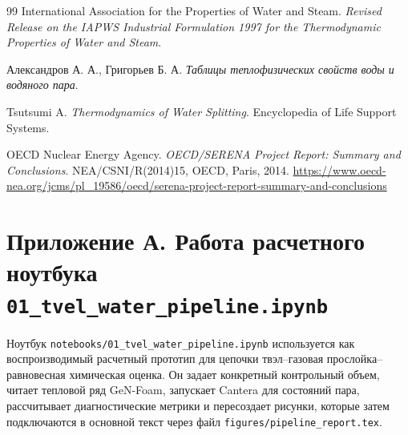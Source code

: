 \documentclass[12pt]{article}
\begin{document}
\begin{thebibliography}{99}
International Association for the Properties of Water and Steam.
\textit{Revised Release on the IAPWS Industrial Formulation 1997 for the Thermodynamic Properties of Water and Steam}.

Александров А. А., Григорьев Б. А.
\textit{Таблицы теплофизических свойств воды и водяного пара}.

Tsutsumi A.
\textit{Thermodynamics of Water Splitting}.
Encyclopedia of Life Support Systems.

OECD Nuclear Energy Agency.
\textit{OECD/SERENA Project Report: Summary and Conclusions}.
NEA/CSNI/R(2014)15, OECD, Paris, 2014.
\url{https://www.oecd-nea.org/jcms/pl_19586/oecd/serena-project-report-summary-and-conclusions}

\end{thebibliography}

\newpage
\section*{Приложение А. Работа расчетного ноутбука \texttt{01\_tvel\_water\_pipeline.ipynb}}

Ноутбук \texttt{notebooks/01\_tvel\_water\_pipeline.ipynb} используется как воспроизводимый расчетный прототип для цепочки твэл--газовая прослойка--равновесная химическая оценка. Он задает конкретный контрольный объем, читает тепловой ряд GeN-Foam, запускает Cantera для состояний пара, рассчитывает диагностические метрики и пересоздает рисунки, которые затем подключаются в основной текст через файл \texttt{figures/pipeline\_report.tex}.
\end{document}
